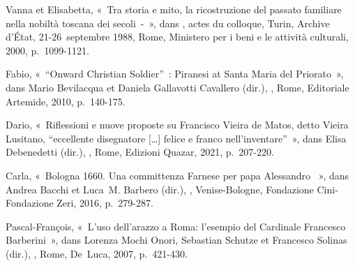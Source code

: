 \begin{teiElement}[name={TEI},change={commons\_edition}]
\begin{teiElement}[name={text},type={book},xmlid={book}]
\begin{teiElement}[name={group},type={book},xmlid={book-001}]
\begin{teiElement}[name={group},type={bibliography},data-page-title={Sources et bibliographie},data-include-href={Ch14\_Source\_bibliographie.xml},xmlid={bibliography-001}]
\begin{teiElement}[name={body}]
\begin{teiDiv}[type={section1},xmlid={div18}]
\begin{teiDiv}[type={section2},xmlid={div19}]
\begin{teiBibl}[xmlid={bibl-323}]
 Vanna et  Elisabetta, « Tra storia e mito, la ricostruzione del passato familiare nella nobiltà toscana dei secoli - », dans , actes du colloque, Turin, Archive d’État, 21-26 septembre 1988, Rome, Ministero per i beni e le attività culturali, 2000, p. 1099-1121.
\end{teiBibl}
              \begin{teiBibl}[xmlid={bibl-324}]
 Fabio, « “Onward Christian Soldier” : Piranesi at Santa Maria del Priorato », dans Mario Bevilacqua et Daniela Gallavotti Cavallero (dir.), , Rome, Editoriale Artemide, 2010, p. 140-175.
\end{teiBibl}
              \begin{teiBibl}[xmlid={bibl-325}]
 Dario, « Riflessioni e nuove proposte su Francisco Vieira de Matos, detto Vieira Lusitano, “eccellente disegnatore […] felice e franco nell’inventare” », dans Elisa Debenedetti (dir.), , Rome, Edizioni Quazar, 2021, p. 207-220.
\end{teiBibl}
              \begin{teiBibl}[xmlid={bibl-326}]
 Carla, « Bologna 1660. Una committenza Farnese per papa Alessandro  », dans Andrea Bacchi et Luca M. Barbero (dir.), , Venise-Bologne, Fondazione Cini-Fondazione Zeri, 2016, p. 279-287.
\end{teiBibl}
              \begin{teiBibl}[xmlid={bibl-327}]
 Pascal-François, « L’uso dell’arazzo a Roma: l’esempio del Cardinale Francesco Barberini », dans Lorenza Mochi Onori, Sebastian Schutze et Francesco Solinas (dir.), , Rome, De Luca, 2007, p. 421-430.
\end{teiBibl}
              \begin{teiBibl}[xmlid={bibl-328}]

\end{teiBibl}
\end{teiDiv}
\end{teiDiv}
\end{teiElement}
\end{teiElement}
\end{teiElement}
\end{teiElement}
\end{teiElement}

